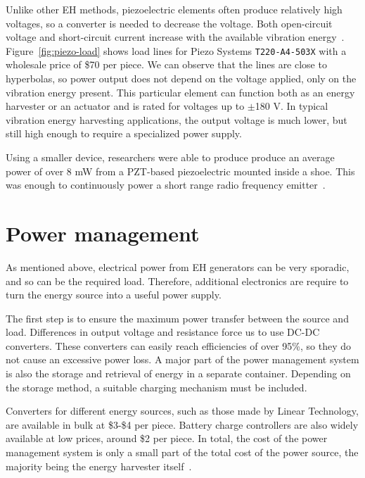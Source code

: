 \documentclass[a4paper,10pt]{article}
\begin{document}
Unlike other \ac{EH} methods, piezoelectric elements often produce relatively high voltages, so a converter is needed to decrease the voltage. Both open-circuit voltage and short-circuit current increase with the available vibration energy~\cite{LT-Piezo}. Figure~\ref{fig:piezo-load} shows load lines for Piezo Systems \texttt{T220-A4-503X} with a wholesale price of \$70 per piece. We can observe that the lines are close to hyperbolas, so power output does not depend on the voltage applied, only on the vibration energy present. This particular element can function both as an energy harvester or an actuator and is rated for voltages up to $\pm$180 V. In typical vibration energy harvesting applications, the output voltage is much lower, but still high enough to require a specialized power supply. 

Using a smaller device, researchers were able to produce produce an average power of over 8 mW from a \ac{PZT}-based piezoelectric mounted inside a shoe. This was enough to continuously power a short range radio frequency emitter~\cite{piezo-shoe-ieee}. 


\section{Power management}

As mentioned above, electrical power from \ac{EH} generators can be very sporadic, and so can be the required load. Therefore, additional electronics are require to turn the energy source into a useful power supply. 

The first step is to ensure the maximum power transfer between the source and load. Differences in output voltage and resistance force us to use DC-DC converters. These converters can easily reach efficiencies of over 95\%, so they do not cause an excessive power loss. A major part of the power management system is also the storage and retrieval of energy in a separate container. Depending on the storage method, a suitable charging mechanism must be included. 

Converters for different energy sources, such as those made by Linear Technology, are available in bulk at \$3-\$4 per piece. Battery charge controllers are also widely available at low prices, around \$2 per piece. In total, the cost of the power management system is only a small part of the total cost of the power source, the majority being the energy harvester itself~\cite{lt:cenik}. 
\end{document}
